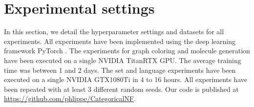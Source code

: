 
\newpage
\section{Experimental settings}
\label{sec:appendix_hyperparams}

In this section, we detail the hyperparameter settings and datasets for all experiments. All experiments have been implemented using the deep learning framework PyTorch \cite{PyTorch}.
The experiments for graph coloring and molecule generation have been executed on a single NVIDIA TitanRTX GPU. The average training time was between 1 and 2 days. The set and language experiments have been executed on a single NVIDIA GTX1080Ti in 4 to 16 hours. All experiments have been repeated with at least 3 different random seeds. Our code is published at \href{https://github.com/phlippe/CategoricalNF}{https://github.com/phlippe/CategoricalNF}.

